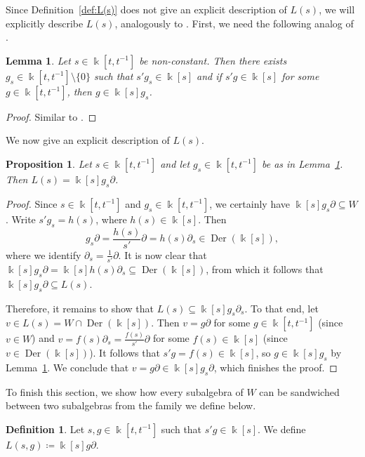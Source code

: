 \documentclass[12pt]{amsart}
\theoremstyle{plain}
\newtheorem{proposition}[theorem]{Proposition}
\newtheorem{lemma}[theorem]{Lemma}
\theoremstyle{definition}
\newtheorem{definition}[theorem]{Definition}
\numberwithin{equation}{section}
\def\kk{\Bbbk}
\DeclareMathOperator{\Der}{Der}
\def\del{\partial}
\def\nonzero{\setminus \{0\}}
\begin{document}
Since Definition~\ref{def:L(s)} does not give an explicit description of $L(s)$, we will explicitly describe $L(s)$, analogously to \cite[Notation 4.11]{Buzaglo}. First, we need the following analog of \cite[Proposition 4.13]{Buzaglo}.

\begin{lemma}\label{lem:g_s}
    Let $s \in \kk[t,t^{-1}]$ be non-constant. Then there exists $g_s \in \kk[t,t^{-1}] \nonzero$ such that $s'g_s \in \kk[s]$ and if $s'g \in \kk[s]$ for some $g \in \kk[t,t^{-1}]$, then $g \in \kk[s]g_s$.
\end{lemma}
\begin{proof}
    Similar to \cite[Proposition 4.13]{Buzaglo}.
\end{proof}

We now give an explicit description of $L(s)$.

\begin{proposition}\label{prop:L(s)}
    Let $s \in \kk[t,t^{-1}]$ and let $g_s \in \kk[t,t^{-1}]$ be as in Lemma~\ref{lem:g_s}. Then $L(s) = \kk[s]g_s \del$.
\end{proposition}
\begin{proof}
    Since $s \in \kk[t,t^{-1}]$ and $g_s \in \kk[t,t^{-1}]$, we certainly have $\kk[s]g_s\del \subseteq W$. Write $s'g_s = h(s)$, where $h(s) \in \kk[s]$. Then
    $$g_s\del = \frac{h(s)}{s'}\del = h(s)\del_s \in \Der(\kk[s]),$$
    where we identify $\del_s = \frac{1}{s'}\del$. It is now clear that $\kk[s]g_s\del = \kk[s]h(s)\del_s \subseteq \Der(\kk[s])$, from which it follows that $\kk[s]g_s\del \subseteq L(s)$.

    Therefore, it remains to show that $L(s) \subseteq \kk[s]g_s\del_s$. To that end, let $v \in L(s) = W \cap \Der(\kk[s])$. Then $v = g\del$ for some $g \in \kk[t,t^{-1}]$ (since $v \in W$) and $v = f(s)\del_s = \frac{f(s)}{s'}\del$ for some $f(s) \in \kk[s]$ (since $v \in \Der(\kk[s])$). It follows that $s'g = f(s) \in \kk[s]$, so $g \in \kk[s]g_s$ by Lemma~\ref{lem:g_s}. We conclude that $v = g\del \in \kk[s]g_s\del$, which finishes the proof.
\end{proof}

To finish this section, we show how every subalgebra of $W$ can be sandwiched between two subalgebras from the family we define below.

\begin{definition}
    Let $s,g \in \kk[t,t^{-1}]$ such that $s'g \in \kk[s]$. We define $L(s,g) \coloneqq \kk[s]g\del$.
\end{definition}
\end{document}
